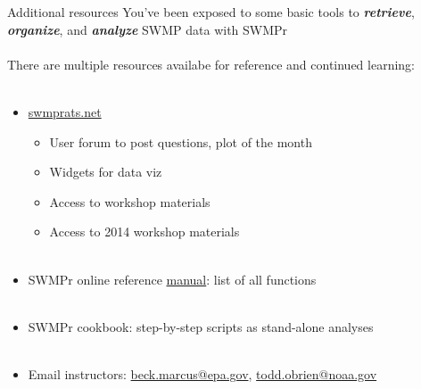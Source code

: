 \documentclass[xcolor=dvipsnames]{beamer}\usepackage[]{graphicx}\usepackage[]{color}
\newcommand{\Bigtxt}[1]{\textbf{\textit{#1}}}
\begin{document}
\begin{frame}{Additional resources}
You've been exposed to some basic tools to \Bigtxt{retrieve}, \Bigtxt{organize}, and \Bigtxt{analyze} SWMP data with SWMPr \\~\\
There are multiple resources availabe for reference and continued learning: \\~\\
\begin{itemize}
\item \href{http://swmprats.net/}{swmprats.net}
\begin{itemize}
\item User forum to post questions, plot of the month
\item Widgets for data viz
\item Access to workshop materials
\item Access to 2014 workshop materials \\~\\
\end{itemize}
\item SWMPr online reference \href{https://cran.r-project.org/web/packages/SWMPr/SWMPr.pdf}{manual}: list of all functions \\~\\
\item SWMPr cookbook: step-by-step scripts as stand-alone analyses \\~\\
\item Email instructors: \href{mailto:beck.marcus@epa.gov}{beck.marcus@epa.gov}, \href{todd.obrien@noaa.gov}{todd.obrien@noaa.gov}
\end{itemize}
\end{frame}

\end{document}
